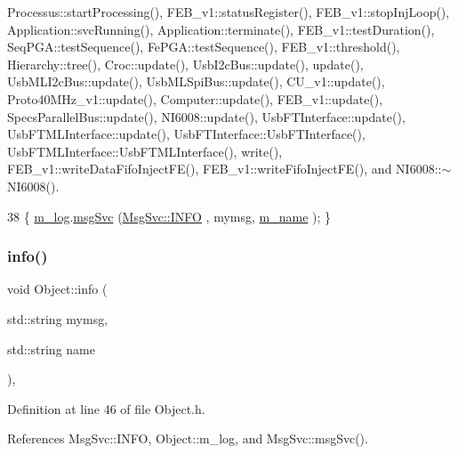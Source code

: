 Processus\+::start\+Processing(), F\+E\+B\+\_\+v1\+::status\+Register(), F\+E\+B\+\_\+v1\+::stop\+Inj\+Loop(), Application\+::svc\+Running(), Application\+::terminate(), F\+E\+B\+\_\+v1\+::test\+Duration(), Seq\+P\+G\+A\+::test\+Sequence(), Fe\+P\+G\+A\+::test\+Sequence(), F\+E\+B\+\_\+v1\+::threshold(), Hierarchy\+::tree(), Croc\+::update(), Usb\+I2c\+Bus\+::update(), update(), Usb\+M\+L\+I2c\+Bus\+::update(), Usb\+M\+L\+Spi\+Bus\+::update(), C\+U\+\_\+v1\+::update(), Proto40\+M\+Hz\+\_\+v1\+::update(), Computer\+::update(), F\+E\+B\+\_\+v1\+::update(), Specs\+Parallel\+Bus\+::update(), N\+I6008\+::update(), Usb\+F\+T\+Interface\+::update(), Usb\+F\+T\+M\+L\+Interface\+::update(), Usb\+F\+T\+Interface\+::\+Usb\+F\+T\+Interface(), Usb\+F\+T\+M\+L\+Interface\+::\+Usb\+F\+T\+M\+L\+Interface(), write(), F\+E\+B\+\_\+v1\+::write\+Data\+Fifo\+Inject\+F\+E(), F\+E\+B\+\_\+v1\+::write\+Fifo\+Inject\+F\+E(), and N\+I6008\+::$\sim$\+N\+I6008().


\begin{DoxyCode}
38 \{ \hyperlink{classObject_a0d269813dd7ac1f24bc143031e2963f2}{m\_log}.\hyperlink{classMsgSvc_ad25f18047920cc59a314e5098259711c}{msgSvc} (\hyperlink{classMsgSvc_ae671eb7301996cd049d2da8a65925926ad2fcf3f3e734fc41ee097cc23670ce51}{MsgSvc::INFO}    , mymsg, \hyperlink{classObject_a8b83c95c705d2c3ba0d081fe1710f48d}{m\_name} ); \}
\end{DoxyCode}
\mbox{\label{classObject_a1ca123253dfd30fc28b156f521dcbdae}} 
\subsubsection{\texorpdfstring{info()}{info()}\hspace{0.1cm}{\footnotesize\ttfamily [2/2]}}
{\footnotesize\ttfamily void Object\+::info (\begin{DoxyParamCaption}\item[{std\+::string}]{mymsg,  }\item[{std\+::string}]{name }\end{DoxyParamCaption})\hspace{0.3cm}{\ttfamily [inline]}, {\ttfamily [inherited]}}



Definition at line 46 of file Object.\+h.



References Msg\+Svc\+::\+I\+N\+FO, Object\+::m\+\_\+log, and Msg\+Svc\+::msg\+Svc().


